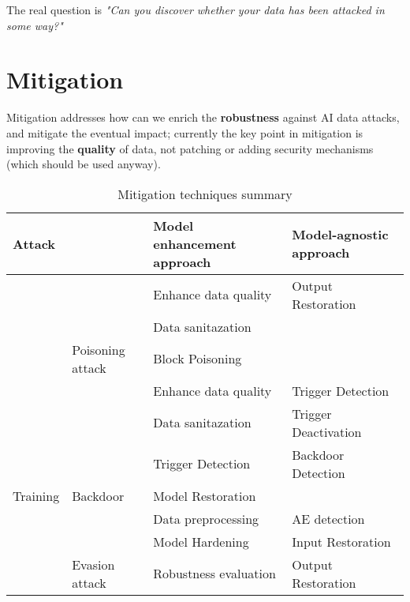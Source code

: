\begin{center}
   The real question is \emph{"Can you discover whether your data has been \emph{attacked} in some way?"}
\end{center}
\newpage   
\section{Mitigation}
Mitigation addresses how can we enrich the \textbf{robustness} against AI data attacks, and mitigate the eventual impact;
currently the key point in mitigation is improving the \textbf{quality} of data, not patching or adding security mechanisms (which should be used anyway).

\begin{table}[ht]
   \centering
   \caption{Mitigation techniques summary}
   \label{tab:mitigation_summary}
   \begin{tabular}{@{}llll@{}}
   \toprule
   \multicolumn{2}{|l|}{Attack}                                                                                                      & \multicolumn{1}{l|}{Model enhancement approach} & \multicolumn{1}{l|}{Model-agnostic approach}        \\ \midrule
   \multicolumn{1}{c}{}                           & & {Enhance data quality}     & {Output Restoration}           \\
   \multicolumn{1}{c}{}                           & & {Data sanitazation}        & \\
   \multicolumn{1}{c}{}                           & \multirow{-3}{*}{{Poisoning attack}} & {Block Poisoning}          & \\ \cmidrule(l){2-4} 
   \multicolumn{1}{c}{}                           & & {Enhance data quality}     & {Trigger Detection}            \\
   \multicolumn{1}{c}{}                           & & {Data sanitazation}        & {Trigger Deactivation}         \\
   \multicolumn{1}{c}{}                           & & {Trigger Detection}        & {Backdoor Detection}           \\
   \multicolumn{1}{c}{\multirow{-7}{*}{{Training}}} & \multirow{-4}{*}{{Backdoor}}         & {Model Restoration}        & \\ \midrule
   & & {Data preprocessing}       & {AE detection}                 \\
   & & {Model Hardening}          & {Input Restoration}            \\
   & \multirow{-3}{*}{{Evasion attack}}   & {Robustness evaluation}    & {Output Restoration}           \\ \cmidrule(l){2-4} 

\end{tabular}
\end{table}
